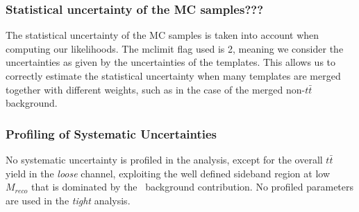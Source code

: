 
\subsubsection{Statistical uncertainty of the MC samples???}
The statistical uncertainty of the MC samples is taken into account when computing our likelihoods.
The {\sc mclimit} flag used is 2, meaning we consider the uncertainties as given by the uncertainties of the templates. 
This allows us to correctly estimate the statistical uncertainty when many templates are merged together with different weights, such as in
the case of the merged non-$t\bar{t}$ background.

\subsubsection{Profiling of Systematic Uncertainties}

No systematic uncertainty is profiled in the analysis, except for the overall 
$t\bar{t}$ yield in the {\sl loose} channel, exploiting the well defined 
sideband region at low $M_{reco}$ that is dominated by the \ttbar\ background
contribution. No profiled parameters are used in the {\sl tight} analysis.

